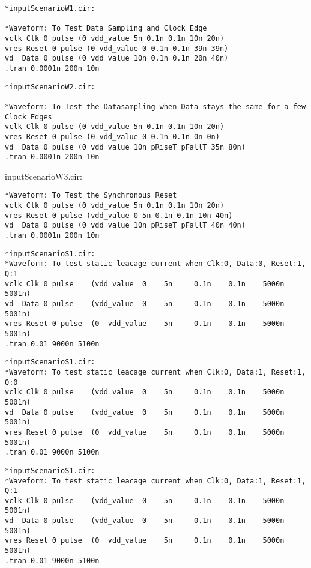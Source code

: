 \begin{lstlisting}
*inputScenarioW1.cir:

*Waveform: To Test Data Sampling and Clock Edge
vclk Clk 0 pulse (0 vdd_value 5n 0.1n 0.1n 10n 20n)     
vres Reset 0 pulse (0 vdd_value 0 0.1n 0.1n 39n 39n)       
vd  Data 0 pulse (0 vdd_value 10n 0.1n 0.1n 20n 40n)
.tran 0.0001n 200n 10n
\end{lstlisting}

\begin{lstlisting}
*inputScenarioW2.cir:

*Waveform: To Test the Datasampling when Data stays the same for a few Clock Edges
vclk Clk 0 pulse (0 vdd_value 5n 0.1n 0.1n 10n 20n)     
vres Reset 0 pulse (0 vdd_value 0 0.1n 0.1n 0n 0n)       
vd  Data 0 pulse (0 vdd_value 10n pRiseT pFallT 35n 80n)     
.tran 0.0001n 200n 10n
\end{lstlisting}

inputScenarioW3.cir:
\begin{lstlisting}
*Waveform: To Test the Synchronous Reset
vclk Clk 0 pulse (0 vdd_value 5n 0.1n 0.1n 10n 20n)     
vres Reset 0 pulse (vdd_value 0 5n 0.1n 0.1n 10n 40n)       
vd  Data 0 pulse (0 vdd_value 10n pRiseT pFallT 40n 40n)
.tran 0.0001n 200n 10n
\end{lstlisting}

\begin{lstlisting}
*inputScenarioS1.cir:
*Waveform: To test static leacage current when Clk:0, Data:0, Reset:1, Q:1
vclk Clk 0 pulse    (vdd_value  0    5n     0.1n    0.1n    5000n     5001n)     
vd  Data 0 pulse    (vdd_value  0    5n     0.1n    0.1n    5000n     5001n)   
vres Reset 0 pulse  (0  vdd_value    5n     0.1n    0.1n    5000n     5001n)   
.tran 0.01 9000n 5100n
\end{lstlisting}

\begin{lstlisting}
*inputScenarioS1.cir:
*Waveform: To test static leacage current when Clk:0, Data:1, Reset:1, Q:0
vclk Clk 0 pulse    (vdd_value  0    5n     0.1n    0.1n    5000n     5001n)     
vd  Data 0 pulse    (vdd_value  0    5n     0.1n    0.1n    5000n     5001n)   
vres Reset 0 pulse  (0  vdd_value    5n     0.1n    0.1n    5000n     5001n)   
.tran 0.01 9000n 5100n
\end{lstlisting}

\begin{lstlisting}
*inputScenarioS1.cir:
*Waveform: To test static leacage current when Clk:0, Data:1, Reset:1, Q:1
vclk Clk 0 pulse    (vdd_value  0    5n     0.1n    0.1n    5000n     5001n)     
vd  Data 0 pulse    (vdd_value  0    5n     0.1n    0.1n    5000n     5001n)   
vres Reset 0 pulse  (0  vdd_value    5n     0.1n    0.1n    5000n     5001n)   
.tran 0.01 9000n 5100n
\end{lstlisting}

